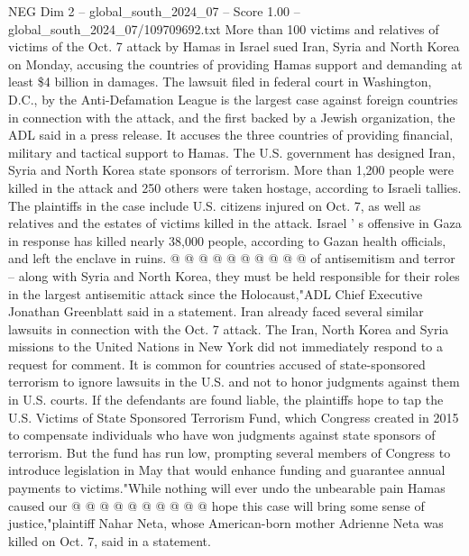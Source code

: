 \begin{textsample}{NEG Dim 2 – global\_south\_2024\_07 – Score 1.00 – global\_south\_2024\_07/109709692.txt}  \label{ex:f2_neg_375}
More than 100 victims and relatives of victims of the Oct. 7 attack by Hamas in Israel sued Iran, Syria and North Korea on Monday, accusing the countries of providing Hamas support and demanding at least \$4 billion in damages.
The lawsuit filed in federal court in Washington, D.C., by the Anti-Defamation League is the largest case against foreign countries in connection with the attack, and the first backed by a Jewish organization, the ADL said in a press release.
It accuses the three countries of providing financial, military and tactical support to Hamas.
The U.S. government has designed Iran, Syria and North Korea state sponsors of terrorism.
More than 1,200 people were killed in the attack and 250 others were taken hostage, according to Israeli tallies.
The plaintiffs in the case include U.S. citizens injured on Oct. 7, as well as relatives and the estates of victims killed in the attack.
Israel ' s offensive in Gaza in response has killed nearly 38,000 people, according to Gazan health officials, and left the enclave in ruins. @ @ @ @ @ @ @ @ @ @ of antisemitism and terror -- along with Syria and North Korea, they must be held responsible for their roles in the largest antisemitic attack since the Holocaust,"ADL Chief Executive Jonathan Greenblatt said in a statement.
Iran already faced several similar lawsuits in connection with the Oct. 7 attack.
The Iran, North Korea and Syria missions to the United Nations in New York did not immediately respond to a request for comment.
It is common for countries accused of state-sponsored terrorism to ignore lawsuits in the U.S. and not to honor judgments against them in U.S. courts.
If the defendants are found liable, the plaintiffs hope to tap the U.S.
Victims of State Sponsored Terrorism Fund, which Congress created in 2015 to compensate individuals who have won judgments against state sponsors of terrorism.
But the fund has run low, prompting several members of Congress to introduce legislation in May that would enhance funding and guarantee annual payments to victims."While nothing will ever undo the unbearable pain Hamas caused our @ @ @ @ @ @ @ @ @ @ hope this case will bring some sense of justice,"plaintiff Nahar Neta, whose American-born mother Adrienne Neta was killed on Oct. 7, said in a statement.

\end{textsample}
